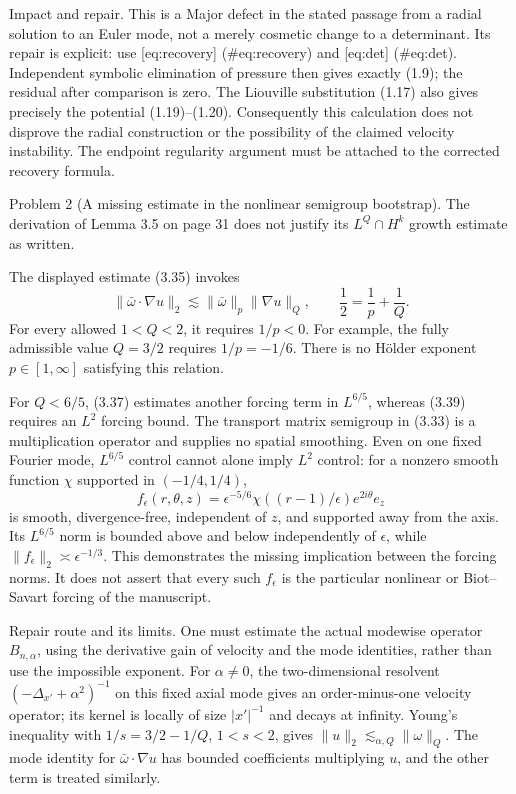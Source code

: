 \documentclass[10pt]{article}
\begin{document}
Impact and repair. This is a Major defect in the stated passage from a radial solution to an Euler mode, not a merely cosmetic change to a determinant. Its repair is explicit: use [eq:recovery] (\#eq:recovery) and [eq:det] (\#eq:det). Independent symbolic elimination of pressure then gives exactly (1.9); the residual after comparison is zero. The Liouville substitution (1.17) also gives precisely the potential (1.19)–(1.20). Consequently this calculation does not disprove the radial construction or the possibility of the claimed velocity instability. The endpoint regularity argument must be attached to the corrected recovery formula.\par
Problem 2 (A missing estimate in the nonlinear semigroup bootstrap).  The derivation of Lemma 3.5 on page 31 does not justify its \(L^Q\cap H^k\) growth estimate as written.\par
The displayed estimate (3.35) invokes \[\|\bar\omega\cdot\nabla u\|_2
 \lesssim \|\bar\omega\|_p\|\nabla u\|_Q,\qquad
 \frac12=\frac1p+\frac1Q.\] For every allowed \(1<Q<2\), it requires \(1/p<0\). For example, the fully admissible value \(Q=3/2\) requires \(1/p=-1/6\). There is no Hölder exponent \(p\in[1,\infty]\) satisfying this relation.\par
For \(Q<6/5\), (3.37) estimates another forcing term in \(L^{6/5}\), whereas (3.39) requires an \(L^2\) forcing bound. The transport matrix semigroup in (3.33) is a multiplication operator and supplies no spatial smoothing. Even on one fixed Fourier mode, \(L^{6/5}\) control cannot alone imply \(L^2\) control: for a nonzero smooth function \(\chi\) supported in \((-1/4,1/4)\), \[f_\epsilon(r,\theta,z)
 =\epsilon^{-5/6}\chi((r-1)/\epsilon)e^{2i\theta}e_z\] is smooth, divergence-free, independent of \(z\), and supported away from the axis. Its \(L^{6/5}\) norm is bounded above and below independently of \(\epsilon\), while \(\|f_\epsilon\|_2\asymp\epsilon^{-1/3}\). This demonstrates the missing implication between the forcing norms. It does not assert that every such \(f_\epsilon\) is the particular nonlinear or Biot–Savart forcing of the manuscript.\par
Repair route and its limits. One must estimate the actual modewise operator \(B_{n,\alpha}\), using the derivative gain of velocity and the mode identities, rather than use the impossible exponent. For \(\alpha\ne0\), the two-dimensional resolvent \((-\Delta_{x'}+\alpha^2)^{-1}\) on this fixed axial mode gives an order-minus-one velocity operator; its kernel is locally of size \(|x'|^{-1}\) and decays at infinity. Young’s inequality with \(1/s=3/2-1/Q\), \(1<s<2\), gives \(\|u\|_2\lesssim_{\alpha,Q}\|\omega\|_Q\). The mode identity for \(\bar\omega\cdot\nabla u\) has bounded coefficients multiplying \(u\), and the other term is treated similarly.\par
\end{document}
